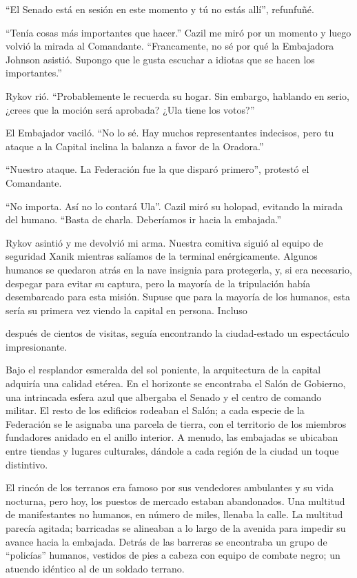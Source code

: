 \documentclass[spanish,12pt,a4paper,oneside,titlepage]{book}
\begin{document}
    ``El Senado está en sesión en este momento y tú no estás allí'', refunfuñé.

    ``Tenía cosas más importantes que hacer.'' Cazil me miró por un momento y luego volvió la mirada al Comandante. ``Francamente, no sé por qué la Embajadora Johnson asistió. Supongo que le gusta escuchar a idiotas que se hacen los importantes.''

    Rykov rió. ``Probablemente le recuerda su hogar. Sin embargo, hablando en serio, ¿crees que la moción será aprobada? ¿Ula tiene los votos?''

    El Embajador vaciló. ``No lo sé. Hay muchos representantes indecisos, pero tu ataque a la Capital inclina la balanza a favor de la Oradora.''

    ``Nuestro ataque. La Federación fue la que disparó primero'', protestó el Comandante.

    ``No importa. Así no lo contará Ula''. Cazil miró su holopad, evitando la mirada del humano. ``Basta de charla. Deberíamos ir hacia la embajada.''

    Rykov asintió y me devolvió mi arma. Nuestra comitiva siguió al equipo de seguridad Xanik mientras salíamos de la terminal enérgicamente. Algunos humanos se quedaron atrás en la nave insignia para protegerla, y, si era necesario, despegar para evitar su captura, pero la mayoría de la tripulación había desembarcado para esta misión. Supuse que para la mayoría de los humanos, esta sería su primera vez viendo la capital en persona. Incluso

    después de cientos de visitas, seguía encontrando la ciudad-estado un espectáculo impresionante.

    Bajo el resplandor esmeralda del sol poniente, la arquitectura de la capital adquiría una calidad etérea. En el horizonte se encontraba el Salón de Gobierno, una intrincada esfera azul que albergaba el Senado y el centro de comando militar. El resto de los edificios rodeaban el Salón; a cada especie de la Federación se le asignaba una parcela de tierra, con el territorio de los miembros fundadores anidado en el anillo interior. A menudo, las embajadas se ubicaban entre tiendas y lugares culturales, dándole a cada región de la ciudad un toque distintivo.

    El rincón de los terranos era famoso por sus vendedores ambulantes y su vida nocturna, pero hoy, los puestos de mercado estaban abandonados. Una multitud de manifestantes no humanos, en número de miles, llenaba la calle. La multitud parecía agitada; barricadas se alineaban a lo largo de la avenida para impedir su avance hacia la embajada. Detrás de las barreras se encontraba un grupo de ``policías'' humanos, vestidos de pies a cabeza con equipo de combate negro; un atuendo idéntico al de un soldado terrano.
\end{document}
